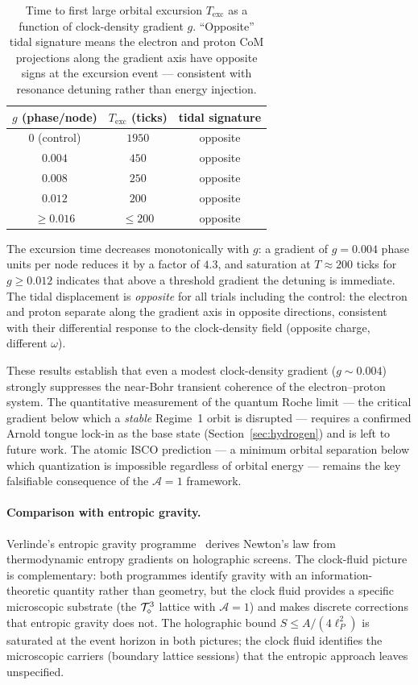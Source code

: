 \begin{table}[h]
\centering
\begin{tabular}{ccc}
\hline
$g$ (phase/node) & $T_\text{exc}$ (ticks) & tidal signature \\
\hline
$0$ (control) & $1950$ & opposite \\
$0.004$       & $450$  & opposite \\
$0.008$       & $250$  & opposite \\
$0.012$       & $200$  & opposite \\
$\geq 0.016$  & $\leq 200$ & opposite \\
\hline
\end{tabular}
\caption{Time to first large orbital excursion $T_\text{exc}$ as a function
of clock-density gradient $g$.  ``Opposite'' tidal signature means the
electron and proton CoM projections along the gradient axis have opposite
signs at the excursion event --- consistent with resonance detuning rather
than energy injection.}
\label{tab:roche}
\end{table}

The excursion time decreases monotonically with $g$: a gradient of
$g = 0.004$ phase units per node reduces it by a factor of $4.3$, and
saturation at $T \approx 200$ ticks for $g \geq 0.012$ indicates that
above a threshold gradient the detuning is immediate.
The tidal displacement is \emph{opposite} for all trials including the
control: the electron and proton separate along the gradient axis in
opposite directions, consistent with their differential response to the
clock-density field (opposite charge, different $\omega$).

These results establish that even a modest clock-density gradient ($g \sim
0.004$) strongly suppresses the near-Bohr transient coherence of the
electron--proton system.
The quantitative measurement of the quantum Roche limit --- the critical
gradient below which a \emph{stable} Regime~1 orbit is disrupted ---
requires a confirmed Arnold tongue lock-in as the base state
(Section~\ref{sec:hydrogen}) and is left to future work.
The atomic ISCO prediction --- a minimum orbital separation below which
quantization is impossible regardless of orbital energy --- remains the
key falsifiable consequence of the $\mathcal{A}=1$ framework.

\paragraph{Comparison with entropic gravity.}
Verlinde's entropic gravity programme~\cite{verlinde2011} derives Newton's
law from thermodynamic entropy gradients on holographic screens.
The clock-fluid picture is complementary: both programmes identify gravity
with an information-theoretic quantity rather than geometry, but the clock
fluid provides a specific microscopic substrate (the $\mathcal{T}_\diamond^3$ lattice
with $\mathcal{A}=1$) and makes discrete corrections that entropic gravity
does not.
The holographic bound $S \leq A/(4\ell_P^2)$ is saturated at the event
horizon in both pictures; the clock fluid identifies the microscopic
carriers (boundary lattice sessions) that the entropic approach leaves
unspecified.
